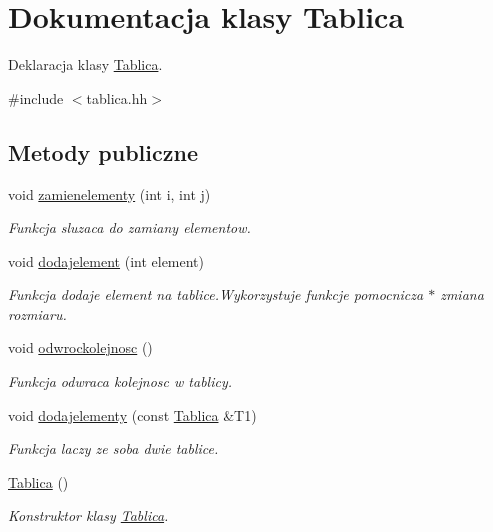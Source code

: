 \hypertarget{class_tablica}{\section{Dokumentacja klasy Tablica}
\label{class_tablica}
}


Deklaracja klasy \hyperlink{class_tablica}{Tablica}.  




{\ttfamily \#include $<$tablica.\-hh$>$}

\subsection*{Metody publiczne}
\begin{DoxyCompactItemize}
\item 
void \hyperlink{class_tablica_a4f69d95776f0ea1454a87bb72562713b}{zamienelementy} (int i, int j)
\begin{DoxyCompactList}\small\item\em Funkcja sluzaca do zamiany elementow. \end{DoxyCompactList}\item 
void \hyperlink{class_tablica_ad4d99dc2ca07689167d703ba24a4dab2}{dodajelement} (int element)
\begin{DoxyCompactList}\small\item\em Funkcja dodaje element na tablice.\-Wykorzystuje funkcje pomocnicza $\ast$ zmiana rozmiaru. \end{DoxyCompactList}\item 
void \hyperlink{class_tablica_ae63b8d381eb4f6a19cae52241228ae07}{odwrockolejnosc} ()
\begin{DoxyCompactList}\small\item\em Funkcja odwraca kolejnosc w tablicy. \end{DoxyCompactList}\item 
void \hyperlink{class_tablica_ac5b21c0e98c4f5ac5c728b99f092b112}{dodajelementy} (const \hyperlink{class_tablica}{Tablica} \&T1)
\begin{DoxyCompactList}\small\item\em Funkcja laczy ze soba dwie tablice. \end{DoxyCompactList}\item 
\hyperlink{class_tablica_a5f484e7b0478e1ff9b62e894f9d7b28d}{Tablica} ()
\begin{DoxyCompactList}\small\item\em Konstruktor klasy \hyperlink{class_tablica}{Tablica}. \end{DoxyCompactList}\item 

\end{DoxyCompactItemize}
